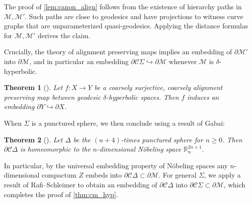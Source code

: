 \documentclass[twoside]{amsart}
\theoremstyle{plain}
\newtheorem{theorem}{Theorem}[section]
\theoremstyle{break}
\theoremstyle{definition}
\theoremstyle{remark}
\newcommand{\R}{\mathbb{R}}
\newcommand{\dfn}{\mathrel{\mathop:}=}
\DeclareMathOperator{\diam}{diam}
\newcommand{\cc}{\mathcal C}
\newcommand{\M}{\mathcal M}
\begin{document}
\noindent
The proof of \cref{lem:canon_align} follows from the existence of
hierarchy paths \cite[Thm.~4.4]{hhsii} in $\M,\M'$. Such paths are close to
geodesics and have projections
to witness curve graphs that are unparameterized quasi-geodesics.
Applying the distance formulas for $\M,\M'$ derives the claim.

Crucially, the theory of alignment preserving maps implies an
embedding of $\partial \M'$ into $\partial \M$, and in particular an
embedding $\partial \cc \Sigma \hookrightarrow \partial \M$ whenever $\M$ is
$\delta$-hyperbolic.



\begin{theorem}[{\cite[Thm.~3.2]{align}}]
  \label{thm:dtboundaries}
  Let $f : X \to Y$ be a coarsely surjective, coarsely alignment
  preserving map between geodesic 
  $\delta$-hyperbolic spaces.  Then $f$ induces an embedding
  $\partial Y \hookrightarrow \partial X$.
\end{theorem}

\noindent
When $\Sigma$ is a punctured sphere, we then conclude using a result
of Gabai:
\begin{theorem}[{\cite[Thm.~1.2]{gabai}}]\label{thm:gabai}
   Let $\Delta$ be the $(n + 4)$-times punctured sphere for $n \geq 0$.  
   Then $\partial \cc \Delta$ is
   homeomorphic to the $n$-dimensional N\"obeling space
   $\R^{2n+1}_n$.
\end{theorem}
\noindent
In particular, by the universal embedding property of N\"obeling
spaces \cite{nobeling} any $n$-dimensional compactum $Z$ embeds into $\partial
\cc \Delta \subset \partial \M$.  For general $\Sigma$, we apply a
result of Rafi--Schleimer \cite[Thm.~7.1]{rafischleimer} to obtain an
embedding of $\partial \cc \Delta$ into $\partial \cc \Sigma \subset
\partial \M$, which
completes the proof of \cref{thm:cm_hyp}.
\end{document}
